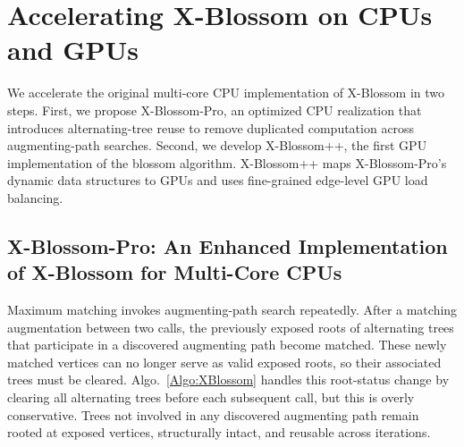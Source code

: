 \section{Accelerating X-Blossom on CPUs and GPUs}
We accelerate the original multi-core CPU implementation of X-Blossom in two steps. 
First, we propose X-Blossom-Pro, an optimized CPU realization that introduces alternating-tree reuse to remove duplicated computation across augmenting-path searches.
Second, we develop X-Blossom++, the first GPU implementation of the blossom algorithm.
X-Blossom++ maps X-Blossom-Pro's dynamic data structures to GPUs and uses fine-grained edge-level GPU load balancing.

\subsection{X-Blossom-Pro: An Enhanced Implementation of X-Blossom for Multi-Core CPUs}
\label{subsec:reuse}
Maximum matching invokes augmenting-path search repeatedly.
After a matching augmentation between two calls, the previously exposed roots of alternating trees that participate in a discovered augmenting path become matched.
These newly matched vertices can no longer serve as valid exposed roots, so their associated trees must be cleared.
Algo.~\ref{Algo:XBlossom} handles this root-status change by clearing all alternating trees before each subsequent call, but this is overly conservative.
Trees not involved in any discovered augmenting path remain rooted at exposed vertices, structurally intact, and reusable across iterations.

